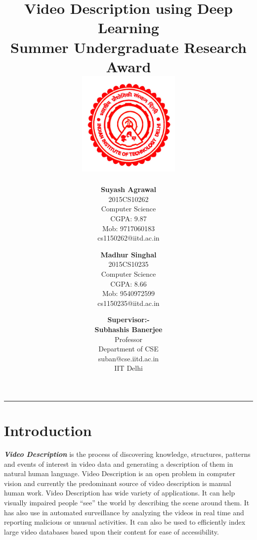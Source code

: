 \documentclass[12pt]{article}
\title{\vspace*{\fill} \textbf{Video Description using Deep Learning}
	  \\ {\large \textbf{Summer Undergraduate Research Award}}
	  \\  \vspace{3mm} \includegraphics[width=5cm]{logo.jpg}}
\author{
	\textbf{Suyash Agrawal}\\ 
	2015CS10262\\
	Computer Science\\
	CGPA: 9.87 \\
	Mob: 9717060183\\
	cs1150262@iitd.ac.in
	\and
	\textbf{Madhur Singhal}\\ 
	2015CS10235\\
	Computer Science\\
	CGPA: 8.66\\
	Mob: 9540972599\\
	cs1150235@iitd.ac.in
}
\date{\textbf{Supervisor:-} \\ \textbf{Subhashis Banerjee} \\ Professor \\ Department of CSE \\ suban@cse.iitd.ac.in\\ IIT Delhi\\
\vspace*{\fill}}
\begin{document}
	\maketitle

\begin{center}
\noindent\rule{3.2cm}{0.4pt} 
\end{center}

	\newpage

	\section{Introduction}
		\textit{\textbf{Video Description}} is the process of discovering knowledge, structures, patterns and events of interest in video data and generating a description of them in natural human language. Video Description is an open problem in computer vision and currently the predominant source of video description is manual human work. 
		\newline
		Video Description has wide variety of applications. It can help visually impaired people ``see'' the world by describing the scene around them. It has also use in automated surveillance by analyzing the videos in real time and reporting malicious or unusual activities. It can also be used to efficiently index large video databases based upon their content for ease of accessibility.
\end{document}
